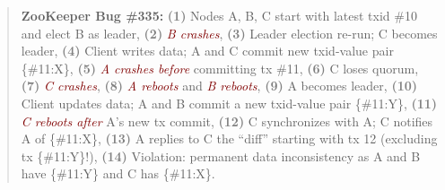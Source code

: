 

\newcommand{\qbeg}{
\begin{quote}
}
\newcommand{\qend}{
\end{quote}
}




\newcommand{\fev}[1]{\textcolor{Maroon}{\textit{#1}}}
\newcommand{\ev}[1]{\textcolor{gray}{\textbf{#1}}}


\def \cbrk {}


\qbeg
{\small
{\bf ZooKeeper Bug \#335:}
\ev{(1)} Nodes A, B, C start with latest txid \#10 and elect
B as leader,
\ev{(2)} \fev{B crashes},
\ev{(3)} Leader election re-run; C becomes leader,
\ev{(4)} Client writes data; A and C commit new txid-value pair \{\#11:X\},
\ev{(5)} \fev{A crashes before} committing tx \#11,
\ev{(6)} C loses quorum,
\ev{(7)} \fev{C crashes},
\ev{(8)} \fev{A reboots} and \fev{B reboots},
\ev{(9)} A becomes leader,
\ev{(10)} Client updates data; A and B commit a new txid-value 
pair \{\#11:Y\},
\ev{(11)} \fev{C reboots after} A's new tx commit,
\ev{(12)} C synchronizes with A; C notifies A of \{\#11:X\},
\ev{(13)} A replies to C the ``diff'' starting 
with tx 12 (excluding tx \{\#11:Y\}!),
\ev{(14)} Violation: permanent data inconsistency as A and B
have \{\#11:Y\} and  C has \{\#11:X\}.
}
\qend

